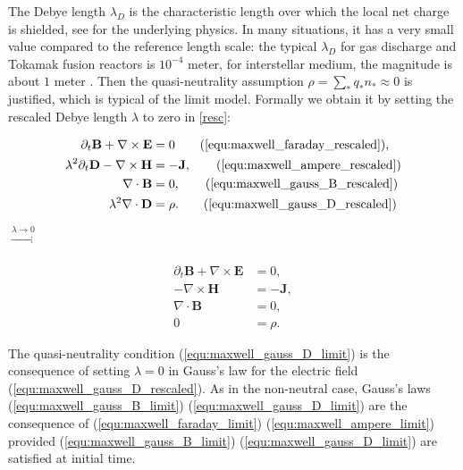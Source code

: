 \documentclass{article}
\begin{document}
The Debye length $\lambda_D$ is the characteristic length over which the local net charge is
shielded, see \cite[Sec. 1.4]{chen2016} for the underlying physics. In many situations, it
has a very small value compared to the reference length scale: the typical $\lambda_D$ for
gas discharge and Tokamak fusion reactors is $10^{-4}$ meter, for interstellar medium, the
magnitude is about $1$ meter \cite[Ch. 20]{Blandford_2013}. Then the quasi-neutrality
assumption $\rho = \sum_* q_*n_* \approx 0$ is justified, which is typical of the limit
model.  Formally we obtain it by setting the rescaled Debye length $\lambda$ to zero in
\eqref{resc}:
\begin{center}
    \begin{minipage}{0.3\textwidth}
    \begin{align*}
        \partial_t \mathbf{B} + \nabla \times \mathbf{E} &= 0 \tag{\ref{equ:maxwell_faraday_rescaled}},\\ 
        \lambda^2 \partial_t \mathbf{D} - \nabla \times \mathbf{H} &= - \mathbf{J}, \tag{\ref{equ:maxwell_ampere_rescaled}}\\
        \nabla \cdot \mathbf{B} &= 0, \tag{\ref{equ:maxwell_gauss_B_rescaled}}\\
        \lambda^2 \nabla \cdot \mathbf{D} &= \rho. \tag{\ref{equ:maxwell_gauss_D_rescaled}}
    \end{align*}
\end{minipage}
\hspace{0.6cm}$\xrightarrow[]{\lambda \rightarrow 0}$
\begin{minipage}{0.3\textwidth}
  \begin{subequations}
    \label{limit}
\begin{align}
    \partial_t \mathbf{B} + \nabla \times \mathbf{E} &= 0, \label{equ:maxwell_faraday_limit} \\ 
    - \nabla \times \mathbf{H} &= - \mathbf{J}, \label{equ:maxwell_ampere_limit} \\
    \nabla \cdot \mathbf{B} &= 0,  \label{equ:maxwell_gauss_B_limit}\\
     0 &= \rho. \label{equ:maxwell_gauss_D_limit}
\end{align}
\end{subequations}
\end{minipage}
\end{center}
The quasi-neutrality condition (\ref{equ:maxwell_gauss_D_limit}) is the consequence of
setting $\lambda = 0$ in Gauss's law for the electric field
(\ref{equ:maxwell_gauss_D_rescaled}). As in the non-neutral case, Gauss's laws
(\ref{equ:maxwell_gauss_B_limit}) (\ref{equ:maxwell_gauss_D_limit}) are the consequence of
(\ref{equ:maxwell_faraday_limit}) (\ref{equ:maxwell_ampere_limit}) provided
(\ref{equ:maxwell_gauss_B_limit}) (\ref{equ:maxwell_gauss_D_limit}) are satisfied at
initial time.
\end{document}
